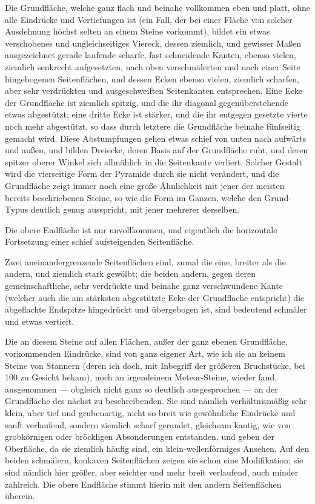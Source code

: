 \documentclass[a4paper, 11pt, oneside, german]{article}
\begin{document}
Die Grundfläche, welche ganz flach und beinahe vollkommen eben und platt, ohne alle Eindrücke und Vertiefungen ist (ein Fall, der bei einer Fläche von solcher Ausdehnung höchst selten an einem Steine vorkommt), bildet ein etwas verschobenes und ungleichseitiges Viereck, dessen ziemlich, und gewisser Maßen ausgezeichnet gerade laufende scharfe, fast schneidende Kanten, ebenso vielen, ziemlich senkrecht aufgesetzten, nach oben verschmälerten und nach einer Seite hingebogenen Seitenflächen, und dessen Ecken ebenso vielen, ziemlich scharfen, aber sehr verdrückten und ausgeschweiften Seitenkanten entsprechen. Eine Ecke der Grundfläche ist ziemlich spitzig, und die ihr diagonal gegenüberstehende etwas abgestützt; eine dritte Ecke ist stärker, und die ihr entgegen gesetzte vierte noch mehr abgestützt, so dass durch letztere die Grundfläche beinahe fünfseitig gemacht wird. Diese Abstumpfungen gehen etwas schief von unten nach aufwärts und außen, und bilden Dreiecke, deren Basis auf der Grundfläche ruht, und deren spitzer oberer Winkel sich allmählich in die Seitenkante verliert. Solcher Gestalt wird die vierseitige Form der Pyramide durch sie nicht verändert, und die Grundfläche zeigt immer noch eine große Ähnlichkeit mit jener der meisten bereits beschriebenen Steine, so wie die Form im Ganzen, welche den Grund-Typus deutlich genug ausspricht, mit jener mehrerer derselben.

Die obere Endfläche ist nur unvollkommen, und eigentlich die horizontale Fortsetzung einer schief aufsteigenden Seitenfläche.

Zwei aneinandergrenzende Seitenflächen sind, zumal die eine, breiter als die andern, und ziemlich stark gewölbt; die beiden andern, gegen deren gemeinschaftliche, sehr verdrückte und beinahe ganz verschwundene Kante (welcher auch die am stärksten abgestützte Ecke der Grundfläche entspricht) die abgeflachte Endspitze hingedrückt und übergebogen ist, sind bedeutend schmäler und etwas vertieft.

Die an diesem Steine auf allen Flächen, außer der ganz ebenen Grundfläche, vorkommenden Eindrücke, sind von ganz eigener Art, wie ich sie an keinem Steine von Stannern (deren ich doch, mit Inbegriff der größeren Bruchstücke, bei 100 zu Gesicht bekam), noch an irgendeinem Meteor-Steine, wieder fand, ausgenommen --- obgleich nicht ganz so deutlich ausgesprochen --- an der Grundfläche des nächst zu beschreibenden. Sie sind nämlich verhältnismäßig sehr klein, aber tief und grubenartig, nicht so breit wie gewöhnliche Eindrücke und sanft verlaufend, sondern ziemlich scharf gerandet, gleichsam kantig, wie von grobkörnigen oder bröckligen Absonderungen entstanden, und geben der Oberfläche, da sie ziemlich häufig sind, ein klein-wellenförmiges Ansehen. Auf den beiden schmälern, konkaven Seitenflächen zeigen sie schon eine Modifikation; sie sind nämlich hier größer, aber seichter und mehr breit verlaufend, auch minder zahlreich. Die obere Endfläche stimmt hierin mit den andern Seitenflächen überein.
\end{document}
